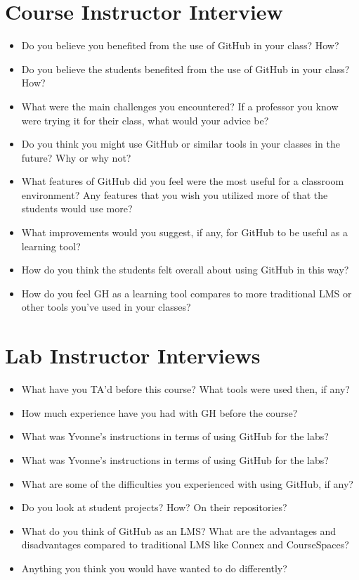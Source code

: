 \section{Course Instructor Interview}
\begin{itemize}
    \item Do you believe you benefited from the use of GitHub in your class? How?
    \item Do you believe the students benefited from the use of GitHub in your class? How?
    \item What were the main challenges you encountered? If a professor you know were trying it for their class, what would your advice be?
    \item Do you think you might use GitHub or similar tools in your classes in the future? Why or why not?
    \item What features of GitHub did you feel were the most useful for a classroom environment? Any features that you wish you utilized more of that the students would use more?
    \item What improvements would you suggest, if any, for GitHub to be useful as a learning tool?
    \item How do you think the students felt overall about using GitHub in this way?
    \item How do you feel GH as a learning tool compares to more traditional LMS or other tools you've used in your classes?
\end{itemize}

\section{Lab Instructor Interviews}
\begin{itemize}
    \item What have you TA'd before this course? What tools were used then, if any?
    \item How much experience have you had with GH before the course?
    \item What was Yvonne's instructions in terms of using GitHub for the labs?
    \item What was Yvonne's instructions in terms of using GitHub for the labs?
    \item What are some of the difficulties you experienced with using GitHub, if any?
    \item Do you look at student projects? How? On their repositories?
    \item What do you think of GitHub as an LMS? What are the advantages and disadvantages compared to traditional LMS like Connex and CourseSpaces?
    \item Anything you think you would have wanted to do differently?
\end{itemize}

